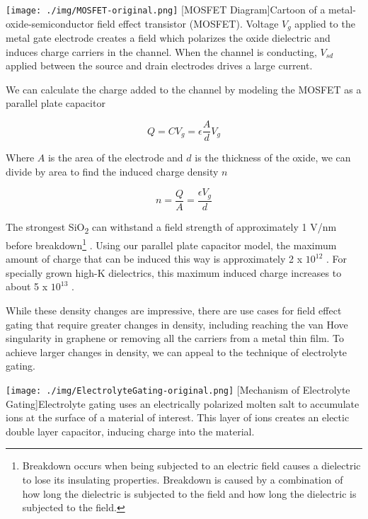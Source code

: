 \begin{centering}
\texttt{[image: ./img/MOSFET-original.png]}
  \captionsetup{width=0.75\textwidth}
  [MOSFET Diagram]{Cartoon of a metal-oxide-semiconductor field effect transistor (MOSFET). Voltage $V_{g}$ applied to the metal gate electrode creates a field which polarizes the oxide dielectric and induces charge carriers in the channel. When the channel is conducting, $V_{sd}$ applied between the source and drain electrodes drives a large current.} 
  \label{fig:ElecGate-1}
\end{centering}

We can calculate the charge added to the channel by modeling the MOSFET as a parallel plate capacitor

\begin{equation}
Q = CV_{g} = \epsilon \frac{A}{d} V_{g}
\end{equation}

Where $A$ is the area of the electrode and $d$ is the thickness of the oxide, we can divide by area to find the induced charge density $n$

\begin{equation}
n = \frac{Q}{A} = \frac{\epsilon V_{g}}{d}
\end{equation}

The strongest SiO\textsubscript{2} can withstand a field strength of approximately 1 V/nm before breakdown\footnote{Breakdown occurs when being subjected to an electric field causes a dielectric to lose its insulating properties. Breakdown is caused by a combination of how long the dielectric is subjected to the field and how long the dielectric is subjected to the field.} \cite{Palumbo2019}. Using our parallel plate capacitor model, the maximum amount of charge that can be induced this way is approximately 2 x $10^{12}$ \percmsq . For specially grown high-K dielectrics, this maximum induced charge increases to about 5 x $10^{13}$ \percmsq \cite{Robertson2004}.

While these density changes are impressive, there are use cases for field effect gating that require greater changes in density, including reaching the van Hove singularity in graphene or removing all the carriers from a metal thin film. To achieve larger changes in density, we can appeal to the technique of electrolyte gating.

\begin{centering}
\texttt{[image: ./img/ElectrolyteGating-original.png]}
  \captionsetup{width=0.75\textwidth}
  [Mechanism of Electrolyte Gating]{Electrolyte gating uses an electrically polarized molten salt to accumulate ions at the surface of a material of interest. This layer of ions creates an electic double layer capacitor, inducing charge into the material.} 
  \label{fig:ElecGate-2}
\end{centering}

